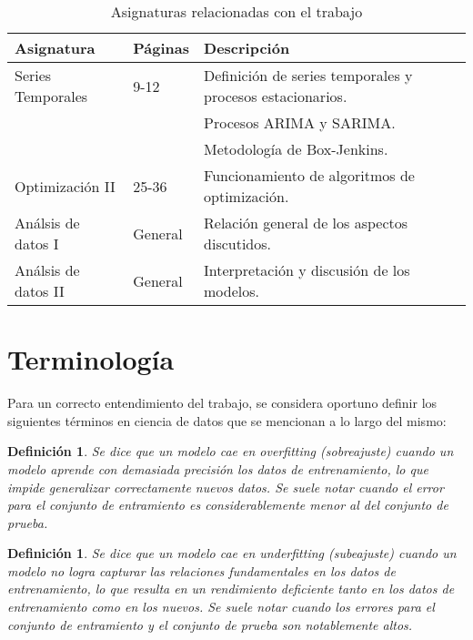 \documentclass[12pt,twoside]{article}
\newtheorem{definition}[theorem]{Definición}
\begin{document}
\begin{table}[ht] 
\centering
\begin{tabular}{llll} 
  \hline
 Asignatura & Páginas & Descripción  \\ 
  \hline
Series Temporales   & 9-12 & Definición de series temporales y procesos estacionarios. \\
& & Procesos ARIMA y SARIMA. \\
& & Metodología de Box-Jenkins.  \\
Optimización II  & 25-36 & Funcionamiento de algoritmos de optimización. \\
Análsis de datos I  & General & Relación general de los aspectos discutidos. \\ 
Análsis de datos II & General & Interpretación y discusión de los modelos. \\ 
\hline
\end{tabular}
\caption{Asignaturas relacionadas con el trabajo} \label{tab{03}}
\end{table}

\newpage

\section{Terminología}

Para un correcto entendimiento del trabajo, se considera oportuno definir los siguientes términos en ciencia de datos que se mencionan a lo largo del mismo:

\begin{definition}\label{def:overfitting}
Se dice que un modelo cae en \textit{overfitting} (sobreajuste) cuando un modelo aprende con demasiada precisión los datos de entrenamiento, lo que impide generalizar correctamente nuevos datos. Se suele notar cuando el error para el conjunto de entramiento es considerablemente menor al del conjunto de prueba.
\end{definition}

\begin{definition}\label{def:underfitting}
Se dice que un modelo cae en \textit{underfitting} (subeajuste) cuando un modelo no logra capturar las relaciones fundamentales en los datos de entrenamiento, lo que resulta en un rendimiento deficiente tanto en los datos de entrenamiento como en los nuevos. Se suele notar cuando los errores para el conjunto de entramiento y el conjunto de prueba son notablemente altos.
\end{definition}
\end{document}
